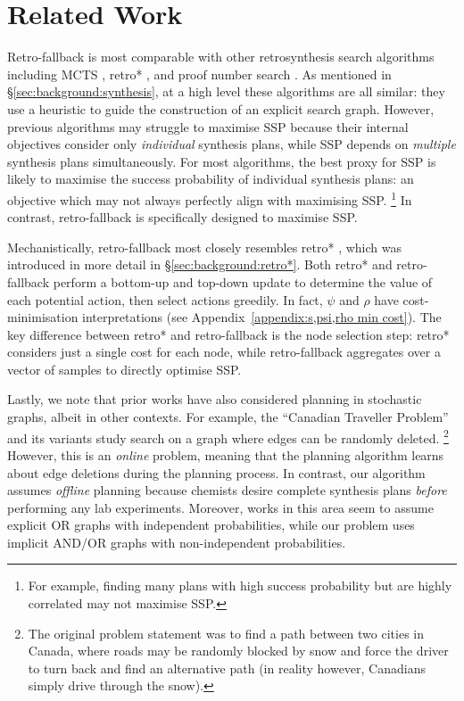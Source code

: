 \section{Related Work}

Retro-fallback is most comparable with other retrosynthesis
search algorithms including
MCTS \citep{segler2018planning},
retro* \citep{chen2020retro},
and proof number search \citep{heifets2012construction,kishimoto2019depth}.
As mentioned in \S\ref{sec:background:synthesis},
at a high level these algorithms are all similar:
they use a heuristic to guide the construction of an explicit search graph.
However, previous algorithms may struggle to maximise SSP
because their internal objectives consider only \emph{individual} synthesis plans,
while SSP depends on \emph{multiple} synthesis plans simultaneously.
For most algorithms, the best proxy for SSP is likely to maximise the success probability of individual synthesis plans:
an objective which may not always perfectly align with maximising SSP.%
\footnote{
    For example, finding many plans with high success probability but are highly correlated
    may not maximise SSP.
}
In contrast, retro-fallback is specifically designed to maximise SSP.

Mechanistically, retro-fallback most closely resembles retro* \citep{chen2020retro},
which was introduced in more detail in \S\ref{sec:background:retro*}.
Both retro* and retro-fallback
perform a bottom-up and top-down update
to determine the value of each potential action, then select actions greedily.
In fact, $\psi$ and $\rho$ have cost-minimisation interpretations
(see Appendix~\ref{appendix:s,psi,rho min cost}).
The key difference between retro* and retro-fallback is the node selection step:
retro* considers just a single cost for each node,
while retro-fallback aggregates over a vector of samples
to directly optimise SSP.

Lastly, we note that 
prior works have also considered planning in stochastic graphs,
albeit in other contexts.
For example, the ``Canadian Traveller Problem'' and its variants \citep{papadimitriou1991shortest}
study search on a graph where edges can be randomly deleted.%
\footnote{
    The original problem statement was to find a path between two cities in Canada,
    where roads may be randomly blocked by snow and force the driver to turn back
    and find an alternative path
    (in reality however, Canadians simply drive through the snow).
}
However, this is an \emph{online} problem,
meaning that the planning algorithm learns about edge deletions during the planning process.
In contrast, our algorithm assumes \emph{offline} planning
because chemists desire complete synthesis plans \emph{before} performing any lab experiments.
Moreover, works in this area seem to assume explicit OR graphs with independent probabilities,
while our problem uses implicit AND/OR graphs with non-independent probabilities.


